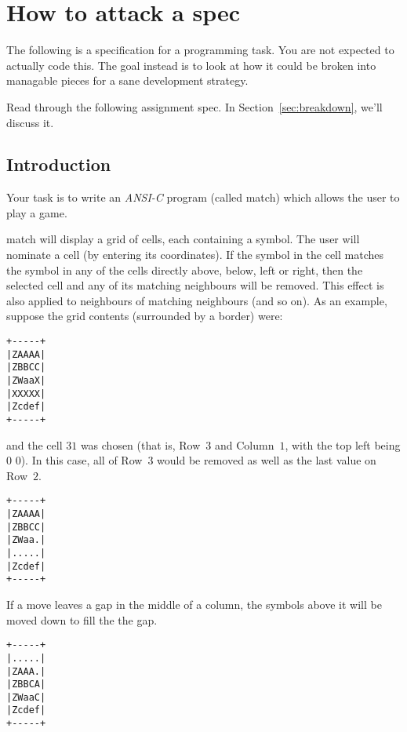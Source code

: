 
\chapter{How to attack a spec}


The following is a specification for a programming task.
You are not expected to actually code this.
The goal instead is to look at how it could be broken into managable pieces 
for a sane development strategy.

Read through the following assignment spec.
In Section~\ref{sec:breakdown}, we'll discuss it.

\section{Introduction}
Your task is to write an \emph{ANSI-C} program (called match) which
allows the user to play a game.

match will display a grid of cells, each containing a symbol.
The user will nominate a cell (by entering its coordinates).
If the symbol in the cell matches the symbol in
any of the cells directly above, below, left or right, then the selected cell and any of its matching neighbours
will be removed.
This effect is also applied to neighbours of matching neighbours (and so on).
As an example, suppose the grid contents (surrounded by a border) were:

\begin{center}
\begin{verbatim}
+-----+
|ZAAAA|
|ZBBCC|
|ZWaaX|
|XXXXX|
|Zcdef|
+-----+
\end{verbatim}
\end{center}
and the cell $3 1$ was chosen (that is, Row~$3$ and Column~$1$, with the top left being $0$ $0$).
In this case, all of Row~$3$ would be removed as well as the last value on Row~$2$.

\pagebreak
\begin{center}
\begin{verbatim}
+-----+
|ZAAAA|
|ZBBCC|
|ZWaa.|
|.....|
|Zcdef|
+-----+
\end{verbatim}
\end{center}

If a move leaves a gap in the middle of a column, the symbols above it will be moved down to fill the
the gap.

\begin{center}
\begin{verbatim}
+-----+
|.....|
|ZAAA.|
|ZBBCA|
|ZWaaC|
|Zcdef|
+-----+
\end{verbatim}
\end{center}

